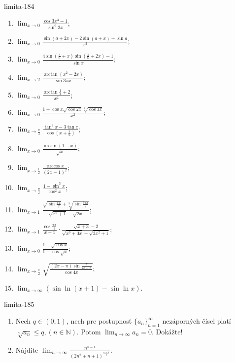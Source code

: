 \begin{defproblem}{limita-184}
\begin{multicols}{2}
\begin{enumerate}
    \item $\lim_{x \rightarrow 0} \frac{\cos 3x^3-1}{\sin ^6 2x}$;
    \item $\lim_{x \rightarrow 0} \frac{\sin (a+2x)-2\sin (a+x)+\sin a}{x^2}$;
    \item $\lim_{x \rightarrow 0} \frac{4\sin (\frac{\pi}{6}+x)\sin (\frac{\pi}{6}+2x)-1}{\sin x}$;

    \item $\lim_{x \rightarrow 2} \frac{\arctan (x^2-2x)}{\sin 3\pi x}$;
    \item $\lim_{x \rightarrow 0} \frac{\arctan \frac{1}{x}+2}{x^2}$;
    \item $\lim_{x \rightarrow 0} \frac{1-\cos x\sqrt{\cos 2x}\sqrt[3]{\cos 3x}}{x^2}$;
    \item $\lim_{x \rightarrow \frac{\pi}{3}} \frac{\tan^3 x-3 \tan c}{\cos (x+\frac{\pi}{6})}$;
    \item $\lim_{x \rightarrow 0} \frac{\arcsin (1-x)}{\sqrt{x}}$;
    \item $\lim_{x \rightarrow \frac{1}{2}} \frac{\arccos x}{(2x-1)^2}$;
    \item $\lim_{x \rightarrow \frac{\pi}{2}} \frac{1-\sin ^3 x}{\cos ^2 x}$;
    \item $\lim_{x \rightarrow 1} \frac{\sqrt{\sin \frac{\pi x}{2}}+\sqrt[3]{\sin \frac{3\pi x}{2}}}{\sqrt{x^2+1}-\sqrt{2x}}$;
    \item $\lim_{x \rightarrow 1} \frac{\cos \frac{\pi x}{2}}{x-1}\cdot \frac{\sqrt{x+3}-2}{\sqrt{x^3+3x}-\sqrt{3x^2+1}}$;
    \item $\lim_{x \rightarrow 0} \frac{1-\sqrt{\cos x}}{1-\cos \sqrt{x}}$;
    \item $\lim_{x \rightarrow \frac{\pi}{2}} \sqrt{\frac{(2x-\pi)\sin \frac{\pi}{2x-\pi}}{\cos 4x}}$;
    \item $\lim_{x \rightarrow \infty} (\sin \ln (x+1)-\sin \ln x)$.
\end{enumerate}
\end{multicols}
\end{defproblem}

\begin{defproblem}{limita-185}
\begin{enumerate}
\item Nech $q \in (0,1)$, nech pre postupnosť ${\{a_n\}}_{n=1}^\infty$ nezáporných čísel platí $\sqrt[n]{a_n}\leq q,(n \in \mathbb{N})$. Potom $\lim_{n \rightarrow \infty} a_n=0$. Dokážte!
\item Nájdite $\lim_{n \rightarrow \infty}\frac{n^{n-1}}{(2n^2+n+1)^{\frac{n+1}{2}}}$.
\end{enumerate}
\end{defproblem}

